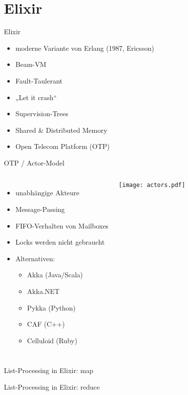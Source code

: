 \documentclass[compress]{beamer}
\begin{document}
\section{Elixir}
  \begin{frame}{Elixir}
    \begin{itemize}
      \item moderne Variante von Erlang (1987, Ericsson)
      \item Beam-VM
      \item Fault-Taulerant
      \item „Let it crash“
      \item Supervision-Trees
      \item Shared \& Distributed Memory
      \item Open Telecom Platform (OTP)
    \end{itemize}
  \end{frame}

  \begin{frame}{OTP / Actor-Model}
    \begin{columns}[c]
    \begin{itemize}
      \item unabhängige Akteure
      \item Message-Passing
      \item FIFO-Verhalten von \alert{Mailboxes}
      \item Locks werden nicht gebraucht
      \item Alternativen:
        \begin{itemize}
          \item Akka (Java/Scala)
          \item Akka.NET
          \item Pykka (Python)
          \item CAF (C++)
          \item Celluloid (Ruby)
        \end{itemize}
    \end{itemize}
      \texttt{[image: actors.pdf]}
    \end{columns}
  \end{frame}
  
  \begin{frame}{List-Processing in Elixir: map}
  \end{frame}

  \begin{frame}{List-Processing in Elixir: reduce}
  \end{frame}
\end{document}
